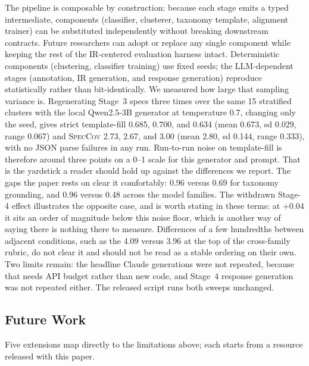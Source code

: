 \documentclass[sigconf, anonymous]{acmart}
\begin{document}
The pipeline is composable by construction: because each stage emits a typed intermediate, components (classifier, clusterer, taxonomy template, alignment trainer) can be substituted independently without breaking downstream contracts. Future researchers can adopt or replace any single component while keeping the rest of the IR-centered evaluation harness intact. Deterministic components (clustering, classifier training) use fixed seeds; the LLM-dependent stages (annotation, IR generation, and response generation) reproduce statistically rather than bit-identically. We measured how large that sampling variance is. Regenerating Stage~3 specs three times over the same 15 stratified clusters with the local Qwen2.5-3B generator at temperature 0.7, changing only the seed, gives strict template-fill 0.685, 0.700, and 0.634 (mean 0.673, sd 0.029, range 0.067) and \textsc{SpecCov} 2.73, 2.67, and 3.00 (mean 2.80, sd 0.144, range 0.333), with no JSON parse failures in any run. Run-to-run noise on template-fill is therefore around three points on a 0--1 scale for this generator and prompt. That is the yardstick a reader should hold up against the differences we report. The gaps the paper rests on clear it comfortably: 0.96 versus 0.69 for taxonomy grounding, and 0.96 versus 0.48 across the model families. The withdrawn Stage-4 effect illustrates the opposite case, and is worth stating in these terms: at $+0.04$ it sits an order of magnitude below this noise floor, which is another way of saying there is nothing there to measure. Differences of a few hundredths between adjacent conditions, such as the 4.09 versus 3.96 at the top of the cross-family rubric, do not clear it and should not be read as a stable ordering on their own. Two limits remain: the headline Claude generations were not repeated, because that needs API budget rather than new code, and Stage~4 response generation was not repeated either. The released script runs both sweeps unchanged.

\subsection{Future Work}\label{future-work}
Five extensions map directly to the limitations above; each starts from a resource released with this paper.
\end{document}
